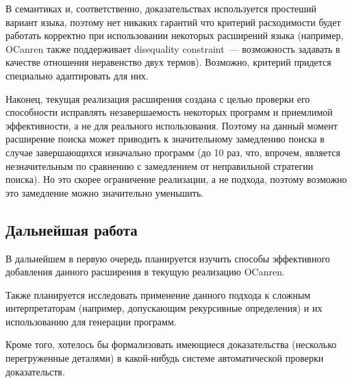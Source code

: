     В семантиках и, соответственно, доказательствах используется простеший вариант языка, поэтому нет никаких гарантий что критерий расходимости будет работать корректно при использовании некоторых расширений языка (например, OCanren также поддерживает disequality constraint~--- возможность задавать в качестве отношения неравенство двух термов). Возможно, критерий придется специально адаптировать для них.
    
    Наконец, текущая реализация расширения создана с целью проверки его способности исправлять незавершаемость некоторых программ и приемлимой эффективности, а не для реального использования. Поэтому на данный момент расширение поиска может приводить к значительному замедлению поиска в случае завершающихся изначально программ (до 10 раз, что, впрочем, является незначительным по сравнению с замедлением от неправильной стратегии поиска). Но это скорее ограничение реализации, а не подхода, поэтому возможно это замедление можно значительно уменьшить.
    
  \subsection{Дальнейшая работа}
  
    В дальнейшем в первую очередь планируется изучить способы эффективного добавления данного расширения в текущую реализацию OCanren.
    
    Также планируется исследовать применение данного подхода к сложным интерпретаторам (например, допускающим рекурсивные определения) и их использованию для генерации программ.
    
    Кроме того, хотелось бы формализовать имеющиеся доказательства (несколько перегруженные деталями) в какой-нибудь системе автоматической проверки доказательств.
  
